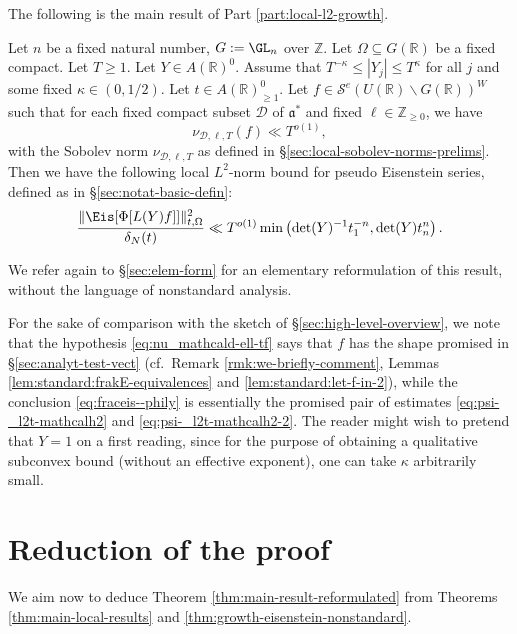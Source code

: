 The following is the main result of Part \ref{part:local-l2-growth}.

\begin{theorem}\label{thm:growth-eisenstein-nonstandard}
  Let $n$ be a fixed natural number, $G := \GL_n$ over $\mathbb{Z}$.  Let $\Omega \subseteq G(\mathbb{R})$ be a fixed compact.  Let $T \geq 1$.  Let $Y \in A(\mathbb{R})^0$.  Assume that $T^{-\kappa} \leq |Y_j| \leq T^{\kappa}$ for all $j$ and some fixed $\kappa \in (0,1/2)$.  Let $t \in A(\mathbb{R})^0_{\geq 1}$.  Let $f \in \mathcal{S}^e(U(\mathbb{R}) \backslash G(\mathbb{R}))^W$ such that for each fixed compact subset $\mathcal{D}$ of $\mathfrak{a}^*$ and fixed $\ell \in \mathbb{Z}_{\geq 0}$, we have
  \begin{equation}\label{eq:nu_mathcald-ell-tf}
    \nu_{\mathcal{D},\ell,T}(f) \ll T^{o(1)},
  \end{equation}
  with the Sobolev norm $\nu_{\mathcal{D},\ell,T}$ as defined in \S\ref{sec:local-sobolev-norms-prelims}.  Then we have the following local $L^2$-norm bound for pseudo Eisenstein series, defined as in \S\ref{sec:notat-basic-defin}:
  \begin{equation}\label{eq:fraceis--phily}
    \frac{\|\Eis [ \Phi[L(Y) f] ] \|_{t,\Omega}^2}{\delta_N(t)}
    \ll T^{o(1)} \min \left( \det(Y)^{-1} t_1^{-n}, \det(Y) t_n^n \right).
  \end{equation}
\end{theorem}
We refer again to \S\ref{sec:elem-form} for an elementary reformulation of this result, without the language of nonstandard analysis.

\begin{remark}
  For the sake of comparison with the sketch of \S\ref{sec:high-level-overview}, we note that the hypothesis \eqref{eq:nu_mathcald-ell-tf} says that $f$ has the shape promised in \S\ref{sec:analyt-test-vect} (cf.\ Remark \ref{rmk:we-briefly-comment}, Lemmas \ref{lem:standard:frakE-equivalences} and \ref{lem:standard:let-f-in-2}), while the conclusion \eqref{eq:fraceis--phily} is essentially the promised pair of estimates \eqref{eq:psi-_l2t-mathcalh2} and \eqref{eq:psi-_l2t-mathcalh2-2}.  The reader might wish to pretend that $Y = 1$ on a first reading, since for the purpose of obtaining a qualitative subconvex bound (without an effective exponent), one can take $\kappa$ arbitrarily small.
\end{remark}

\section{Reduction of the proof}\label{sec:reduction-proof-0}
We aim now to deduce Theorem \ref{thm:main-result-reformulated} from Theorems \ref{thm:main-local-results} and \ref{thm:growth-eisenstein-nonstandard}.

